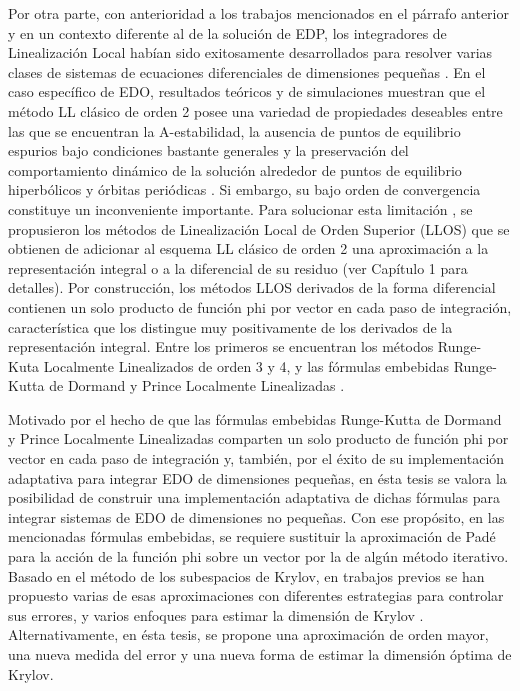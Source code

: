 Por otra parte, con anterioridad a los trabajos mencionados en el párrafo anterior y en un contexto diferente al de la solución de EDP, los integradores de Linealización Local habían sido exitosamente desarrollados para resolver varias clases de sistemas de ecuaciones diferenciales de dimensiones pequeñas \cite{jimenez2020}.
 En el caso específico de EDO, resultados teóricos y de simulaciones muestran que el método LL clásico de orden 2  \cite{pope1963exponential} posee una variedad de propiedades deseables entre las que se encuentran la A-estabilidad, la ausencia de puntos de equilibrio espurios bajo condiciones bastante generales y la preservación del comportamiento dinámico de la solución alrededor de puntos de equilibrio hiperbólicos y órbitas periódicas \cite{Jimenez02AMC}. Si embargo, su bajo orden de convergencia constituye un inconveniente importante. Para solucionar esta limitación \cite{delaCruz06,delaCruz07,Jimenez13}, se propusieron los métodos de Linealización Local de Orden Superior (LLOS) que se obtienen de adicionar al esquema LL clásico de orden 2 una aproximación a la representación integral o a la diferencial de su residuo (ver Capítulo 1 para detalles). Por construcción, los métodos LLOS derivados de la forma diferencial contienen un solo  producto de función phi por vector en cada paso de integración, característica que los distingue muy positivamente de los derivados de la representación integral. Entre los primeros se encuentran los métodos Runge-Kuta Localmente Linealizados de orden 3 y 4, y las fórmulas embebidas Runge-Kutta de Dormand y Prince Localmente Linealizadas \cite{delaCruz06,Jimenez13,Jimenez14AMC}.

Motivado por el hecho de que las fórmulas embebidas Runge-Kutta de Dormand y Prince Localmente Linealizadas comparten un solo producto de función phi por vector en cada paso de integración y, también, por el éxito de su implementación adaptativa para integrar EDO de dimensiones pequeñas, en ésta tesis se valora la posibilidad de construir una implementación adaptativa de dichas fórmulas para integrar sistemas de EDO de dimensiones no pequeñas. Con ese propósito, en las mencionadas fórmulas embebidas, se requiere sustituir la aproximación de Padé para la acción de la función phi sobre un vector por la de algún método iterativo. Basado en el método de los subespacios de Krylov, en trabajos previos se han propuesto varias de esas aproximaciones con diferentes estrategias para controlar sus errores, y varios enfoques para estimar la dimensión de Krylov \cite{hochbruck1998exponential,sidje1998expokit,niesen2012algorithm,gaudreault2018kiops}. Alternativamente, en ésta tesis, se propone una aproximación de orden mayor, una nueva medida del error y una nueva forma de estimar la dimensión óptima de Krylov.

